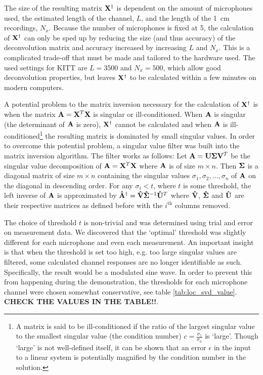 \documentclass[11pt,titlepage]{report}
\begin{document}
The size of the resulting matrix $\mathbf{X}^\dagger$ is dependent on the amount of microphones used, the estimated length of the channel, $L$, and the length of the \SI{1}{cm} recordings, $N_x$. Because the number of microphones is fixed at \num{5}, the calculation of $\mathbf{X}^\dagger$ can only be sped up by reducing the size (and thus accuracy) of the deconvolution matrix and accuracy increased by increasing $L$ and $N_x$. This is a complicated trade-off that must be made and tailored to the hardware used. The used settings for KITT are $L=3500$ and $N_x=500$, which allow good deconvolution properties, but leaves $\mathbf{X}^\dagger$ to be calculated within a few minutes on modern computers.

A potential problem to the matrix inversion necessary for the calculation of $\mathbf{X}^\dagger$ is when the matrix $\mathbf{A}=\mathbf{X}^T\mathbf{X}$ is singular or ill-conditioned. When $\mathbf{A}$ is singular (the determinant of $\mathbf{A}$ is zero), $\mathbf{X}^\dagger$ cannot be calculated and when $\mathbf{A}$ is ill-conditioned\footnote{A matrix is said to be ill-conditioned if the ratio of the largest singular value to the smallest singular value (the condition number) $c=\frac{\sigma_1}{\sigma_n}$ is `large'. Though `large' is not well-defined itself, it can be shown \cite{epo4-manual} that an error $\epsilon$ in the input to a linear system is potentially magnified by the condition number in the solution.} the resulting matrix is dominated by small singular values. In order to overcome this potential problem, a singular value filter was built into the matrix inversion algorithm. The filter works as follows:
Let $\mathbf{A}=\mathbf{U}\mathbf{\Sigma}\mathbf{V}^T$ be the singular value decomposition of $\mathbf{A}=\mathbf{X}^T\mathbf{X}$ where $\mathbf{A}$ is of size $m\times n$. Then $\mathbf{\Sigma}$ is a diagonal matrix of size $m \times n$ containing the singular values $\sigma_1, \sigma_2, ..., \sigma_n$ of $\mathbf{A}$ on the diagonal in descending order. For any $\sigma_i<t$, where $t$ is some threshold, the left inverse of $\mathbf{A}$ is approximated by $\mathbf{\hat{A}}^\dagger=\mathbf{\hat{V}}\mathbf{\hat{\Sigma}}^{-1}\mathbf{\hat{U}}^T$ where $\mathbf{\hat{V}}$, $\mathbf{\hat{\Sigma}}$ and $\mathbf{\hat{U}}$ are their respective matrices as defined before with the $i^\text{th}$ columns removed. 

The choice of threshold $t$ is non-trivial and was determined using trial and error on measurement data. We discovered that the `optimal' threshold was slightly different for each microphone and even each measurement. An important insight is that when the threshold is set too high, e.g. too large singular values are filtered, some calculated channel responses are no longer identifiable as such. Specifically, the result would be a modulated sine wave. In order to prevent this from happening during the demonstration, the thresholds for each microphone channel were chosen somewhat conservative, see table \ref{tab:loc_svd_value}. \textbf{CHECK THE VALUES IN THE TABLE!!}.
\end{document}
